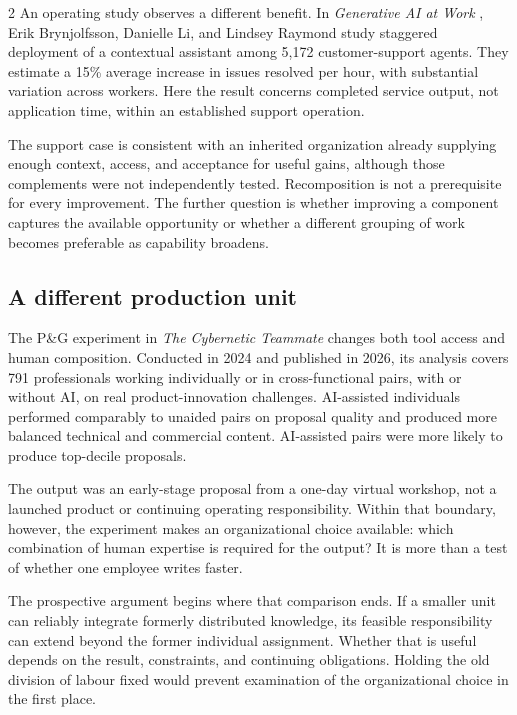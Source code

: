 \begin{multicols}{2}
An operating study observes a different benefit. In \emph{Generative AI
at Work} \citep{brynjolfsson2025work}, Erik Brynjolfsson, Danielle Li,
and Lindsey Raymond study staggered deployment of a contextual assistant
among 5,172 customer-support agents. They estimate a 15\% average
increase in issues resolved per hour, with substantial variation across
workers. Here the result concerns completed service output, not
application time, within an established support operation.

The support case is consistent with an inherited organization already
supplying enough context, access, and acceptance for useful gains,
although those complements were not independently tested. Recomposition
is not a prerequisite for every improvement. The further question is
whether improving a component captures the available opportunity or
whether a different grouping of work becomes preferable as capability
broadens.

\subsection{A different production
unit}\label{a-different-production-unit}

The P\&G experiment in \emph{The Cybernetic Teammate}
\citep{dellacqua2026teammate} changes both tool access and human
composition. Conducted in 2024 and published in 2026, its analysis
covers 791 professionals working individually or in cross-functional
pairs, with or without AI, on real product-innovation challenges.
AI-assisted individuals performed comparably to unaided pairs on
proposal quality and produced more balanced technical and commercial
content. AI-assisted pairs were more likely to produce top-decile
proposals.

The output was an early-stage proposal from a one-day virtual workshop,
not a launched product or continuing operating responsibility. Within
that boundary, however, the experiment makes an organizational choice
available: which combination of human expertise is required for the
output? It is more than a test of whether one employee writes faster.

The prospective argument begins where that comparison ends. If a smaller
unit can reliably integrate formerly distributed knowledge, its feasible
responsibility can extend beyond the former individual assignment.
Whether that is useful depends on the result, constraints, and
continuing obligations. Holding the old division of labour fixed would
prevent examination of the organizational choice in the first place.


\end{multicols}
